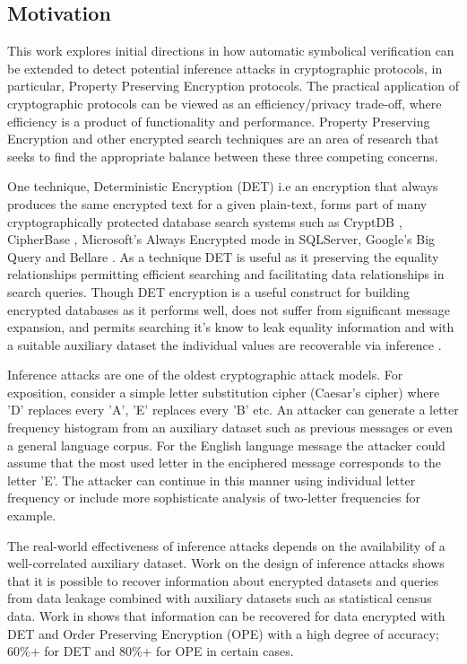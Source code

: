 \documentclass[journal]{IEEEtran}
\begin{document}
\subsection{Motivation}
This work explores initial directions in how automatic symbolical verification can be extended to detect potential inference attacks in cryptographic protocols, in particular, Property Preserving Encryption protocols.
The practical application of cryptographic protocols can be viewed as an efficiency/privacy trade-off\cite{GenericAttacks}, where efficiency is a product of functionality and performance. Property Preserving Encryption and other encrypted search techniques\cite{SOK2017} are an area of research that seeks to find the appropriate balance between these three competing concerns.   

One technique, Deterministic Encryption (DET) i.e an encryption that always produces the same encrypted text for a given plain-text, forms part of many cryptographically protected database search systems\cite{SOK2017} such as CryptDB \cite{Popa2011}, CipherBase \cite{cipherbase}, Microsoft's Always Encrypted mode in SQLServer\cite{AlwaysEncrypted}, Google's Big Query\cite{BigQuery} and Bellare \cite{Bellare2007}. As a technique DET is useful as it preserving the equality relationships permitting efficient searching and facilitating data relationships in search queries. Though DET encryption is a useful construct for building encrypted databases as it performs well, does not suffer from significant message expansion, and  permits searching it's know to leak equality information \cite{SOK2017} and with a suitable auxiliary dataset the individual values are recoverable via inference\cite{InfrenceAttacks} . 

Inference attacks are one of the  oldest\cite{Arab} cryptographic attack models. For exposition, consider a simple letter substitution cipher (Caesar's cipher) where 'D' replaces every 'A', 'E' replaces every 'B' etc. An attacker can generate a letter frequency histogram from an auxiliary dataset such as previous messages or even a general language corpus. For the English language message the attacker could assume that the most used letter in the enciphered message corresponds to the letter 'E'. The attacker can continue in this manner using individual letter frequency or include more sophisticate analysis of two-letter frequencies for example.

The real-world effectiveness of inference attacks depends on the availability of a well-correlated auxiliary dataset. Work\cite{Ismal2012} on the design of inference attacks  shows that it is possible to recover information about encrypted datasets and queries from data leakage combined with auxiliary datasets such as statistical census data. Work in \cite{InfrenceAttacks} shows that information can be recovered for data encrypted with DET and Order Preserving Encryption (OPE) with a high degree of accuracy; 60\%+ for DET and 80\%+ for OPE in certain cases.
\end{document}
